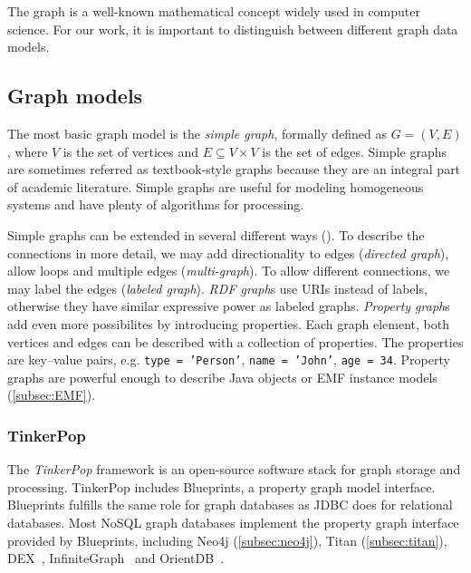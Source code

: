 The graph is a well-known mathematical concept widely used in computer science. For our work, it is important to distinguish between different graph data models.


\subsection{Graph models}
 
The most basic graph model is the \emph{simple graph}, formally defined as $G = (V, E)$, where $V$ is the set of vertices and $E \subseteq V \times V$ is the set of edges. Simple graphs are sometimes referred as textbook-style graphs because they are an integral part of academic literature. Simple graphs are useful for modeling homogeneous systems and have plenty of algorithms for processing.

Simple graphs can be extended in several different ways (). To describe the connections in more detail, we may add directionality to edges (\emph{directed graph}), allow loops and multiple edges (\emph{multi-graph}). To allow different connections, we may label the edges (\emph{labeled graph}). \emph{RDF graph}s use URIs instead of labels, otherwise they have similar expressive power as labeled graphs. \emph{Property graph}s add even more possibilites by introducing properties. Each graph element, both vertices and edges can be described with a collection of properties. The properties are key--value pairs, e.g. \texttt{type = 'Person'}, \texttt{name = 'John'}, \texttt{age = 34}. 
Property graphs are powerful enough to describe Java objects or EMF instance models (\autoref{subsec:EMF}). 

\subsubsection{TinkerPop}

The \textit{TinkerPop} framework is an open-source software stack for graph storage and processing. TinkerPop includes Blueprints, a property graph model interface. Blueprints fulfills the same role for graph databases as JDBC does for relational databases. Most NoSQL graph databases implement the property graph interface provided by Blueprints, including Neo4j (\autoref{subsec:neo4j}), Titan (\autoref{subsec:titan}), DEX~\cite{DEX}, InfiniteGraph~\cite{InfiniteGraph} and OrientDB~\cite{OrientDB}.

